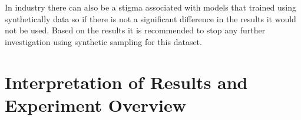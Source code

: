 In industry there can also be a stigma associated with models that trained using synthetically data so if there is not a significant difference in the results it would not be used. Based on the results it is recommended to stop any further investigation using synthetic sampling for this dataset.


\section{Interpretation of Results and Experiment Overview}